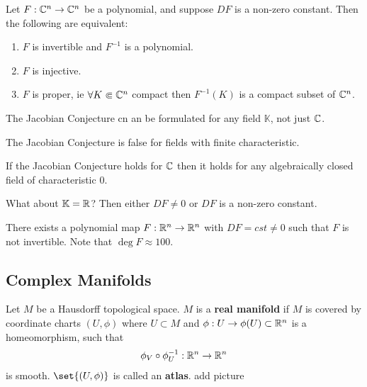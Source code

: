 \begin{theorem}
    Let $F : \mathbb{C}^n \to \mathbb{C}^n$ be a polynomial, and suppose $DF$ is a non-zero constant. Then the following are equivalent:
    \begin{enumerate}
        \item $F$ is invertible and $F^{-1}$ is a polynomial.
        \item $F$ is injective.
        \item $F$ is proper, ie $\forall K \Subset \mathbb{C}^n$ compact then $F^{-1}(K)$ is a compact subset of $\mathbb{C}^n$.
    \end{enumerate}
\end{theorem}

\begin{remark}
    The Jacobian Conjecture cn an be formulated for any field $\mathbb{K}$, not just $\mathbb{C}$.
\end{remark}
\begin{remark}
    The Jacobian Conjecture is false for fields with finite characteristic.
\end{remark}
\begin{remark}
    If the Jacobian Conjecture holds for $\mathbb{C}$ then it holds for any algebraically closed field of characteristic $0$.
\end{remark}
\begin{remark}
    What about $\mathbb{K} = \mathbb{R}$? Then either $DF \neq 0$ or $DF$ is a non-zero constant.
\end{remark}
\begin{nexample}
    There exists a polynomial map $F: \mathbb{R}^n \to \mathbb{R}^n$ with $DF = cst \neq 0$ such that $F$ is not invertible. Note that $\deg F \approx 100$.
\end{nexample}

\subsection{Complex Manifolds}

\begin{definition}
    Let $M$ be a Hausdorff topological space. $M$ is a \textbf{real manifold} if $M$ is covered by coordinate charts $(U,\phi)$ where $U \subset M$ and $\phi : U \to \phi(U) \subset \mathbb{R}^n$ is a homeomorphism, such that
    \begin{align*}
        \phi_V \circ \phi_U^{-1} : \mathbb{R}^n \to \mathbb{R}^n
    \end{align*}
    is smooth. $\set{(U,\phi)}$ is called an \textbf{atlas}.
    add picture
\end{definition}

